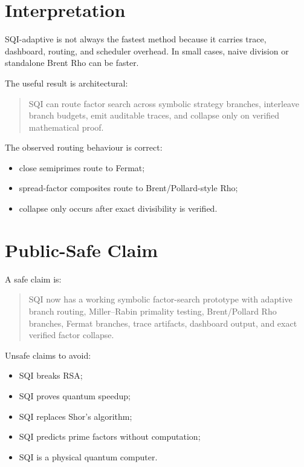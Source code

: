 \documentclass[11pt,a4paper]{article}
\begin{document}
\section{Interpretation}

SQI-adaptive is not always the fastest method because it carries trace, dashboard, routing,
and scheduler overhead. In small cases, naive division or standalone Brent Rho can be faster.

The useful result is architectural:

\begin{quote}
SQI can route factor search across symbolic strategy branches, interleave branch budgets,
emit auditable traces, and collapse only on verified mathematical proof.
\end{quote}

The observed routing behaviour is correct:

\begin{itemize}
  \item close semiprimes route to Fermat;
  \item spread-factor composites route to Brent/Pollard-style Rho;
  \item collapse only occurs after exact divisibility is verified.
\end{itemize}

\section{Public-Safe Claim}

A safe claim is:

\begin{quote}
SQI now has a working symbolic factor-search prototype with adaptive branch routing,
Miller--Rabin primality testing, Brent/Pollard Rho branches, Fermat branches, trace artifacts,
dashboard output, and exact verified factor collapse.
\end{quote}

Unsafe claims to avoid:

\begin{itemize}
  \item SQI breaks RSA;
  \item SQI proves quantum speedup;
  \item SQI replaces Shor's algorithm;
  \item SQI predicts prime factors without computation;
  \item SQI is a physical quantum computer.
\end{itemize}
\end{document}
